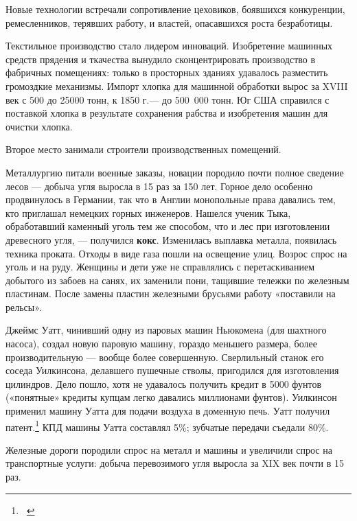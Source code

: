 \documentclass[a4paper]{article}
\begin{document}
{
Новые технологии встречали сопротивление цеховиков, боявшихся конкуренции, ремесленников, терявших работу, и властей,
опасавшихся роста безработицы. }

{
Текстильное производство стало лидером инноваций. Изобретение машинных средств прядения и ткачества вынудило
сконцентрировать производство в фабричных помещениях: только в просторных зданиях удавалось разместить громоздкие
механизмы. Импорт хлопка для машинной обработки вырос за \foreignlanguage{english}{XVIII} век с 500 до 25000 тонн, к
1850 г.— до 500~000 тонн. Юг США справился с поставкой хлопка в результате сохранения рабства и изобретения машин для
очистки хлопка.}

{
Второе место занимали строители производственных помещений. }

{
Металлургию питали военные заказы, новации породило почти полное сведение лесов — добыча угля выросла в 15 раз за 150
лет. Горное дело особенно продвинулось в Германии, так что в Англии монопольные права давались тем, кто приглашал
немецких горных инженеров. Нашелся ученик Тыка, обработавший каменный уголь тем же способом, что и лес при изготовлении
древесного угля, — получился \textbf{кокс}. Изменилась выплавка металла, появилась техника проката. Отходы в виде газа
пошли на освещение улиц. Возрос спрос на уголь и на руду. Женщины и дети уже не справлялись с перетаскиванием добытого
из забоев на санях, их заменили пони, тащившие тележки по железным пластинам. После замены пластин железными брусьями
работу «поставили на рельсы». }

{
Джеймс Уатт, чинивший одну из паровых машин Ньюкомена (для шахтного насоса), создал новую паровую машину, гораздо
меньшего размера, более производительную — вообще более совершенную. Сверлильный станок его соседа Уилкинсона,
делавшего пушечные стволы, пригодился для изготовления цилиндров. Дело пошло, хотя не удавалось получить кредит в 5000
фунтов («понятные» кредиты купцам легко давались миллионами фунтов). Уилкинсон применил машину Уатта для подачи воздуха
в доменную печь. Уатт получил патент.\footnote{\ } КПД машины Уатта составлял 5\%; зубчатые передачи съедали 80\%.}

{
Железные дороги породили спрос на металл и машины и увеличили спрос на транспортные услуги: добыча перевозимого угля
выросла за \foreignlanguage{english}{XIX} век почти в 15 раз.}
\end{document}
